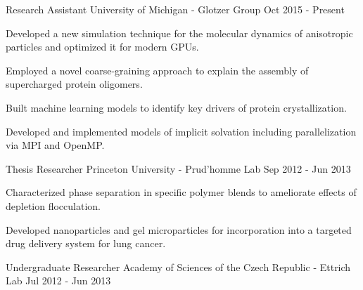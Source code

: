 
\newcommand{\ecoli}{\emph{E. coli }}
\newcommand{\ejub}{\emph{E. jubatus }}
\newcommand{\gal}{\emph{G. g. domesticus}}

\begin{cventries}
  \cventry
    {Research Assistant} %
    {University of Michigan - Glotzer Group} %
    {} %
    {Oct 2015 - Present} %
    {
      \begin{cvitems} %
        \item Developed a new simulation technique for the molecular dynamics of anisotropic particles and optimized it for modern GPUs.
        \item Employed a novel coarse-graining approach to explain the assembly of supercharged protein oligomers.
        \item Built machine learning models to identify key drivers of protein crystallization.
        \item Developed and implemented models of implicit solvation including parallelization via MPI and OpenMP.
      \end{cvitems}
    }
  \cventry
    {Thesis Researcher} %
    {Princeton University - Prud'homme Lab} %
    {} %
    {Sep 2012 - Jun 2013} %
    {
      \begin{cvitems} %
        \item Characterized phase separation in specific polymer blends to ameliorate effects of depletion flocculation.
	    \item Developed nanoparticles and gel microparticles for incorporation into a targeted drug delivery system for lung cancer.
      \end{cvitems}
    }
  \cventry
    {Undergraduate Researcher} %
    {Academy of Sciences of the Czech Republic - Ettrich Lab} %
    {} %
    {Jul 2012 - Jun 2013} %

\end{cventries}
